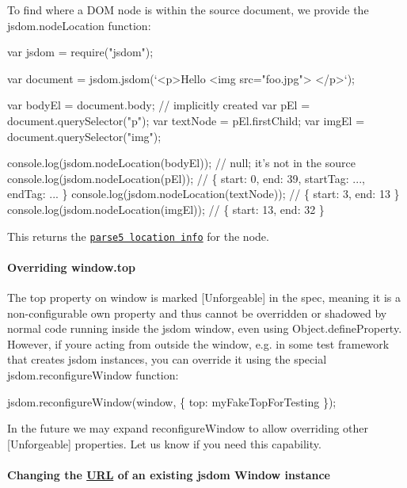 To find where a D\+OM node is within the source document, we provide the {\ttfamily jsdom.\+node\+Location} function\+:


\begin{DoxyCode}
var jsdom = require("jsdom");

var document = jsdom.jsdom(`<p>Hello
    <img src="foo.jpg">
  </p>`);

var bodyEl = document.body; // implicitly created
var pEl = document.querySelector("p");
var textNode = pEl.firstChild;
var imgEl = document.querySelector("img");

console.log(jsdom.nodeLocation(bodyEl));   // null; it's not in the source
console.log(jsdom.nodeLocation(pEl));      // \{ start: 0, end: 39, startTag: ..., endTag: ... \}
console.log(jsdom.nodeLocation(textNode)); // \{ start: 3, end: 13 \}
console.log(jsdom.nodeLocation(imgEl));    // \{ start: 13, end: 32 \}
\end{DoxyCode}


This returns the \href{https://www.npmjs.com/package/parse5#options-locationinfo}{\tt parse5 location info} for the node.

\paragraph*{Overriding {\ttfamily window.\+top}}

The {\ttfamily top} property on {\ttfamily window} is marked {\ttfamily \mbox{[}Unforgeable\mbox{]}} in the spec, meaning it is a non-\/configurable own property and thus cannot be overridden or shadowed by normal code running inside the jsdom window, even using {\ttfamily Object.\+define\+Property}. However, if you\textquotesingle{}re acting from outside the window, e.\+g. in some test framework that creates jsdom instances, you can override it using the special {\ttfamily jsdom.\+reconfigure\+Window} function\+:


\begin{DoxyCode}
jsdom.reconfigureWindow(window, \{ top: myFakeTopForTesting \});
\end{DoxyCode}


In the future we may expand {\ttfamily reconfigure\+Window} to allow overriding other {\ttfamily \mbox{[}Unforgeable\mbox{]}} properties. Let us know if you need this capability.

\paragraph*{Changing the \mbox{\hyperlink{namespace_u_r_l}{U\+RL}} of an existing jsdom {\ttfamily Window} instance}

